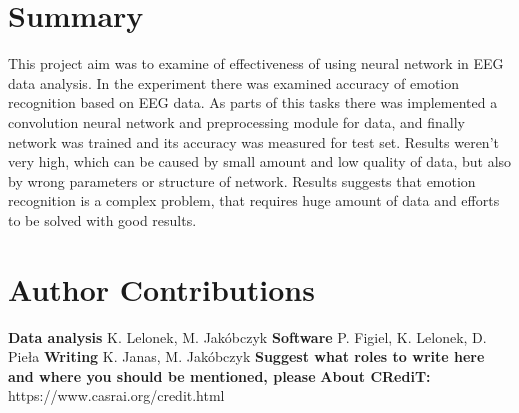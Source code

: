 \documentclass[10pt,journal,compsoc]{IEEEtran}
\begin{document}
\section{Summary}
This project aim was to examine of  effectiveness of using neural network in EEG data analysis. In the experiment there was examined accuracy of emotion recognition based on EEG data. As parts of this tasks there was implemented a convolution neural network and preprocessing module for data, and finally network was trained and its accuracy was measured for test set. Results weren't very high, which can be caused by small amount and low quality of data, but also by wrong parameters or structure of network. Results suggests that emotion recognition is a complex problem, that requires huge amount of data and efforts to be solved with good results.



%


\appendices
\section{Author Contributions}
\textbf{Data analysis} K. Lelonek, M. Jakóbczyk \hfill \break
\textbf{Software} P. Figiel, K. Lelonek, D. Pieła \hfill \break
\textbf{Writing} K. Janas, M. Jakóbczyk \hfill \break
\textbf{Suggest what roles to write here and where you should be mentioned, please} \hfill \break
\textbf{About CRediT:} https://www.casrai.org/credit.html
\end{document}
